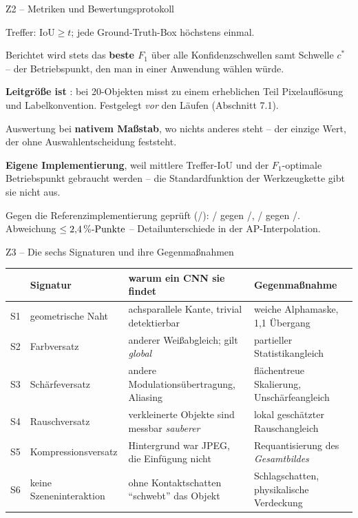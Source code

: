 \documentclass[14pt,aspectratio=169]{beamer}
\begin{document}
\begin{frame}{Z2 -- Metriken und Bewertungsprotokoll}
\zusatzdicht
\begin{punkte}[0.3em]
  \item Treffer: $\mathrm{IoU} \geq t$; jede Ground-Truth-Box höchstens einmal.
  \item Berichtet wird stets das \textbf{beste $F_1$} über alle
        Konfidenzschwellen samt Schwelle $c^*$ -- der Betriebspunkt, den man
        in einer Anwendung wählen würde.
  \item \textbf{Leitgröße ist \mAPfifty}: bei 20\px-Objekten misst \mAPall{}
        zu einem erheblichen Teil Pixelauflösung und Labelkonvention.
        Festgelegt \emph{vor} den Läufen (Abschnitt 7.1).
  \item Auswertung bei \textbf{nativem Maßstab}, wo nichts anderes steht --
        der einzige Wert, der ohne Auswahlentscheidung feststeht.
  \item \textbf{Eigene Implementierung}, weil mittlere Treffer-IoU und der
        $F_1$-optimale Betriebspunkt gebraucht werden -- die
        Standardfunktion der Werkzeugkette gibt sie nicht aus.
  \item Gegen die Referenzimplementierung geprüft (\mAPfifty/\mAPall):
         \zxcValEigen/\zxcValEigenA{} gegen
        \zxcValUlt/\zxcValUltA,  \zxcTestEigen/\zxcTestEigenA{}
        gegen \zxcTestUlt/\zxcTestUltA. Abweichung $\leq2{,}4\,\textnormal{\%-Punkte}$ --
        Detailunterschiede in der AP-Interpolation.
\end{punkte}
\end{frame}

\begin{frame}{Z3 -- Die sechs Signaturen und ihre Gegenmaßnahmen}
\zusatzdicht
\begin{center}
\begin{tabular}{@{}cL{0.17\textwidth}L{0.36\textwidth}L{0.33\textwidth}@{}}
\toprule
 & \textbf{Signatur} & \textbf{warum ein CNN sie findet} &
 \textbf{Gegenmaßnahme} \\
\midrule
S1 & geometrische Naht & achsparallele Kante, trivial detektierbar &
     weiche Alphamaske, 1{,}1\px{} Übergang \\
S2 & Farbversatz & anderer Weißabgleich; gilt \emph{global} &
     partieller Statistikangleich \\
S3 & Schärfeversatz & andere Modulationsübertragung, Aliasing &
     flächentreue Skalierung, Unschärfeangleich \\
S4 & Rauschversatz & verkleinerte Objekte sind messbar \emph{sauberer} &
     lokal geschätzter Rauschangleich \\
S5 & Kompressionsversatz & Hintergrund war JPEG, die Einfügung nicht &
     Requantisierung des \emph{Gesamtbildes} \\
S6 & keine Szeneninteraktion & ohne Kontaktschatten \enquote{schwebt} das
     Objekt & Schlagschatten, physikalische Verdeckung \\
\bottomrule
\end{tabular}
\end{center}

\end{frame}
\end{document}
